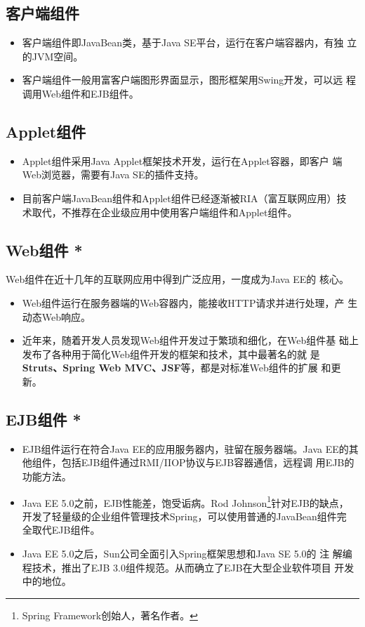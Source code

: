 \subsection{客户端组件} 

\begin{itemize}
\item 客户端组件即JavaBean类，基于Java SE平台，运行在客户端容器内，有独
  立的JVM空间。
\item 客户端组件一般用富客户端图形界面显示，图形框架用Swing开发，可以远
  程调用Web组件和EJB组件。
\end{itemize}

\subsection{Applet组件}

\begin{itemize}
\item Applet组件采用Java Applet框架技术开发，运行在Applet容器，即客户
  端Web浏览器，需要有Java SE的插件支持。
\item 目前客户端JavaBean组件和Applet组件已经逐渐被RIA（富互联网应用）技
  术取代，不推荐在企业级应用中使用客户端组件和Applet组件。
\end{itemize}

\subsection{Web组件 *}

{\hei Web组件在近十几年的互联网应用中得到广泛应用，一度成为Java EE的
  核心。}

\begin{itemize}\kai
\item Web组件运行在服务器端的Web容器内，能接收HTTP请求并进行处理，产
  生动态Web响应。
\item 近年来，随着开发人员发现Web组件开发过于繁琐和细化，在Web组件基
  础上发布了各种用于简化Web组件开发的框架和技术，其中最著名的就
  是{\bf\Blue Struts、Spring Web MVC、JSF}等，都是对标准Web组件的扩展
  和更新。
\end{itemize}

\subsection{EJB组件 *} 

\begin{itemize}
\item EJB组件运行在符合Java EE的应用服务器内，驻留在服务器端。Java
  EE的其他组件，包括EJB组件通过RMI/IIOP协议与EJB容器通信，远程调
  用EJB的功能方法。
\item Java EE 5.0之前，EJB性能差，饱受诟病。Rod
  Johnson\footnote{Spring Framework创始人，著名作者。}针对EJB的缺点，
  开发了轻量级的企业组件管理技术Spring，{\kai\Red 可以使用普通的JavaBean组件完
    全取代EJB组件}。
\item Java EE 5.0之后，Sun公司全面引入Spring框架思想和Java SE 5.0的 {\kai\Red 注
    解编程技术}，推出了EJB 3.0组件规范。从而确立了EJB在大型企业软件项目
  开发中的地位。
\end{itemize}


